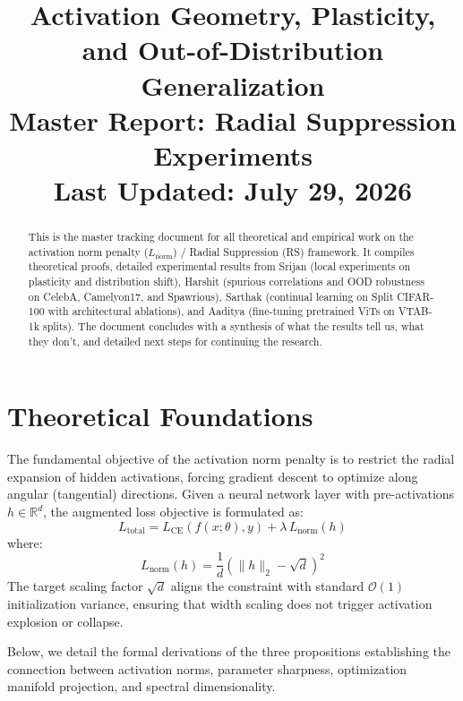\documentclass[11pt,a4paper]{article}
\title{\textbf{Activation Geometry, Plasticity, and Out-of-Distribution Generalization}\\ \large Master Report: Radial Suppression Experiments \\ \normalsize Last Updated: July 29, 2026}
\author{}
\date{}
\begin{document}
\maketitle

\begin{abstract}
This is the master tracking document for all theoretical and empirical work on the activation norm penalty ($L_{\text{norm}}$) / Radial Suppression (RS) framework. It compiles theoretical proofs, detailed experimental results from Srijan (local experiments on plasticity and distribution shift), Harshit (spurious correlations and OOD robustness on CelebA, Camelyon17, and Spawrious), Sarthak (continual learning on Split CIFAR-100 with architectural ablations), and Aaditya (fine-tuning pretrained ViTs on VTAB-1k splits). The document concludes with a synthesis of what the results tell us, what they don't, and detailed next steps for continuing the research.
\end{abstract}

\newpage
\tableofcontents
\newpage

\section{Theoretical Foundations}
\label{sec:theory}

The fundamental objective of the activation norm penalty is to restrict the radial expansion of hidden activations, forcing gradient descent to optimize along angular (tangential) directions. Given a neural network layer with pre-activations $h \in \mathbb{R}^d$, the augmented loss objective is formulated as:
\begin{equation}
\label{eq:total_loss}
L_{\text{total}} = L_{\text{CE}}(f(x;\theta), y) + \lambda\, L_{\text{norm}}(h)
\end{equation}
where:
\begin{equation}
\label{eq:norm_penalty}
L_{\text{norm}}(h) = \frac{1}{d}\left(\|h\|_2 - \sqrt{d}\right)^2
\end{equation}
The target scaling factor $\sqrt{d}$ aligns the constraint with standard $\mathcal{O}(1)$ initialization variance, ensuring that width scaling does not trigger activation explosion or collapse.

Below, we detail the formal derivations of the three propositions establishing the connection between activation norms, parameter sharpness, optimization manifold projection, and spectral dimensionality.
\end{document}
